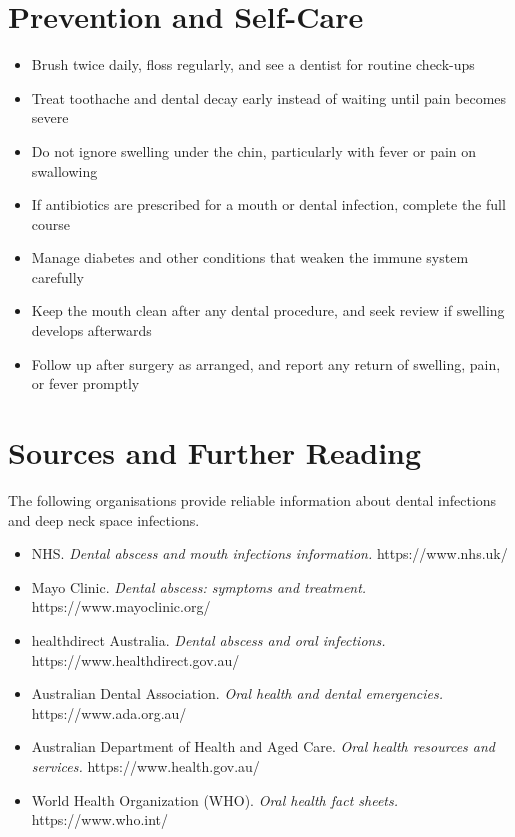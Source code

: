 \section*{Prevention and Self-Care}
\begin{itemize}
    \item Brush twice daily, floss regularly, and see a dentist for routine check-ups
    \item Treat toothache and dental decay early instead of waiting until pain becomes severe
    \item Do not ignore swelling under the chin, particularly with fever or pain on swallowing
    \item If antibiotics are prescribed for a mouth or dental infection, complete the full course
    \item Manage diabetes and other conditions that weaken the immune system carefully
    \item Keep the mouth clean after any dental procedure, and seek review if swelling develops afterwards
    \item Follow up after surgery as arranged, and report any return of swelling, pain, or fever promptly
\end{itemize}

\section*{Sources and Further Reading}
The following organisations provide reliable information about dental infections and deep neck space infections.

\begin{itemize}
    \item NHS. \textit{Dental abscess and mouth infections information.} https://www.nhs.uk/
    \item Mayo Clinic. \textit{Dental abscess: symptoms and treatment.} https://www.mayoclinic.org/
    \item healthdirect Australia. \textit{Dental abscess and oral infections.} https://www.healthdirect.gov.au/
    \item Australian Dental Association. \textit{Oral health and dental emergencies.} https://www.ada.org.au/
    \item Australian Department of Health and Aged Care. \textit{Oral health resources and services.} https://www.health.gov.au/
    \item World Health Organization (WHO). \textit{Oral health fact sheets.} https://www.who.int/
\end{itemize}

\clearpage
